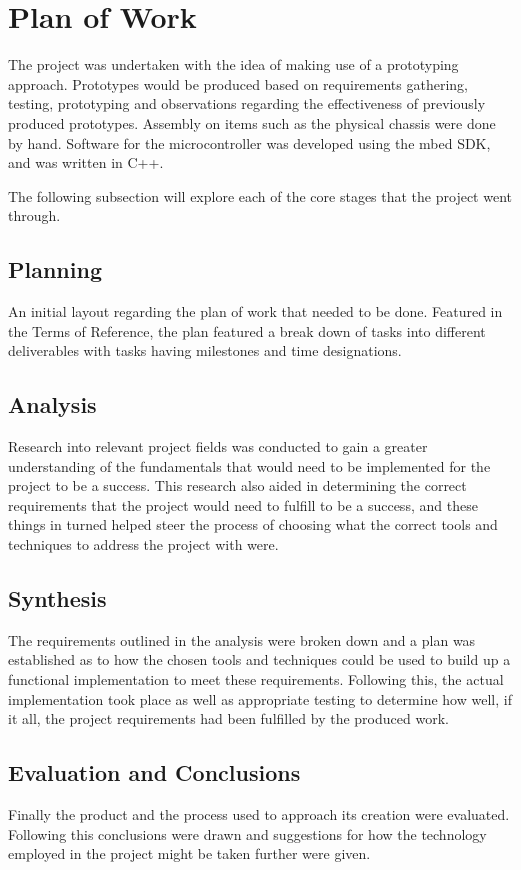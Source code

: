 	\section{Plan of Work}
	The project was undertaken with the idea of making use of a prototyping approach. Prototypes would be produced based on requirements gathering, testing, prototyping and observations regarding the effectiveness of previously produced prototypes. Assembly on items such as the physical chassis were done by hand. Software for the microcontroller was developed using the mbed SDK, and was written in C++.
	
	The following subsection will explore each of the core stages that the project went through.
		\subsection{Planning}
		An initial layout regarding the plan of work that needed to be done. Featured in the Terms of Reference, the plan featured a break down of tasks into different deliverables with tasks having milestones and time designations.
		
		\subsection{Analysis}
		Research into relevant project fields was conducted to gain a greater understanding of the fundamentals that would need to be implemented for the project to be a success. This research also aided in determining the correct requirements that the project would need to fulfill to be a success, and these things in turned helped steer the process of choosing what the correct tools and techniques to address the project with were.
		
		\subsection{Synthesis}
		The requirements outlined in the analysis were broken down and a plan was established as to how the chosen tools and techniques could be used to build up a functional implementation to meet these requirements. Following this, the actual implementation took place as well as appropriate testing to determine how well, if it all, the project requirements had been fulfilled by the produced work.
		
		\subsection{Evaluation and Conclusions}
		Finally the product and the process used to approach its creation were evaluated. Following this conclusions were drawn and suggestions for how the technology employed in the project might be taken further were given.
		
		

